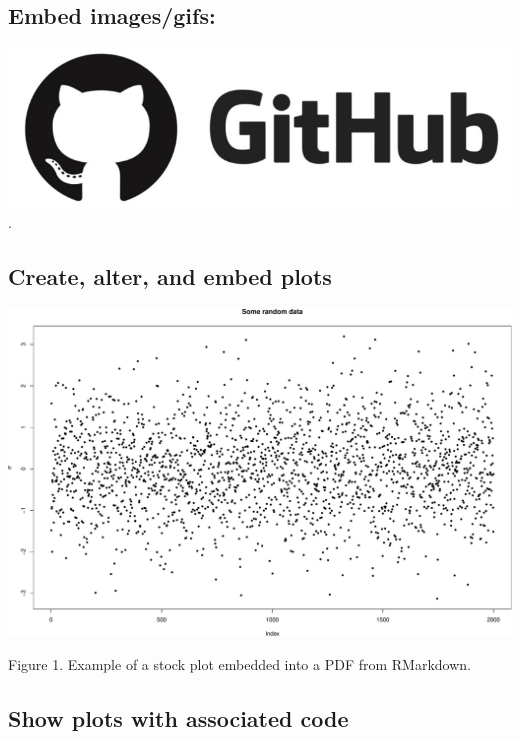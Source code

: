 \documentclass[10,portrait]{article}
\begin{document}
\subsection{Embed images/gifs:}\label{embed-imagesgifs}

\includegraphics{githublogo.png}.

\newpage  

\subsection{Create, alter, and embed
plots}\label{create-alter-and-embed-plots}

\includegraphics{R_is_dope_files/figure-latex/unnamed-chunk-3-1.pdf}

Figure 1. Example of a stock plot embedded into a PDF from RMarkdown.

\newpage  

\subsection{Show plots with associated
code}\label{show-plots-with-associated-code}
\end{document}
